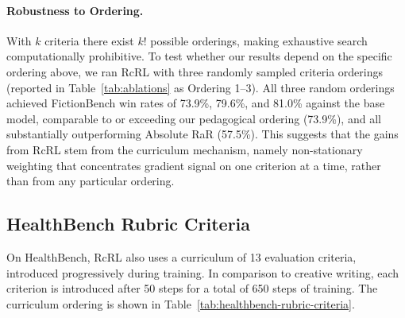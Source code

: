 \documentclass{article}
\theoremstyle{plain}
\theoremstyle{definition}
\theoremstyle{remark}
\begin{document}
\paragraph{Robustness to Ordering.} With $k$ criteria there exist $k!$ possible orderings, making exhaustive search computationally prohibitive. To test whether our results depend on the specific ordering above, we ran RcRL with three randomly sampled criteria orderings (reported in Table~\ref{tab:ablations} as Ordering 1--3). All three random orderings achieved FictionBench win rates of 73.9\%, 79.6\%, and 81.0\% against the base model, comparable to or exceeding our pedagogical ordering (73.9\%), and all substantially outperforming Absolute RaR (57.5\%). This suggests that the gains from RcRL stem from the curriculum mechanism, namely non-stationary weighting that concentrates gradient signal on one criterion at a time, rather than from any particular ordering.

\subsection{HealthBench Rubric Criteria}
\label{app:healthbench-rubric}

On HealthBench, RcRL also uses a curriculum of 13 evaluation criteria, introduced progressively during training. In comparison to creative writing, each criterion is introduced after 50 steps for a total of 650 steps of training. The curriculum ordering is shown in Table~\ref{tab:healthbench-rubric-criteria}.
\end{document}
